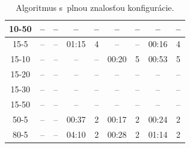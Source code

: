 \documentclass[
  printed, %
  oneside, %
  notable,   %
  nolof,     %
  nolot,     %
]{fithesis3}
\begin{document}
\begin{table}[hp!]
\begin{tabular}{c|cc|cc|cc|cc}
10-50  & -- & -- & -- & -- & -- & -- & -- & -- \\ \hline
15-5  & -- & -- & 01:15 & 4 & -- & -- & \cellcolor{table-green}00:16 & \cellcolor{table-green}4 \\
15-10  & -- & -- & -- & -- & \cellcolor{table-green}00:20 & \cellcolor{table-green}5 & 00:53 & 5 \\
15-20  & -- & -- & -- & -- & -- & -- & -- & -- \\
15-30  & -- & -- & -- & -- & -- & -- & -- & -- \\
15-50  & -- & -- & -- & -- & -- & -- & -- & -- \\ \hline
50-5  & -- & -- & 00:37 & 2 & \cellcolor{table-green}00:17 & \cellcolor{table-green}2 & 00:24 & 2 \\ \hline
80-5  & -- & -- & 04:10 & 2 & \cellcolor{table-green}00:28 & \cellcolor{table-green}2 & 01:14 & 2 \\ 
\end{tabular}%

\caption{Algoritmus s~plnou znalosťou konfigurácie. }
\label{tab:algo1}
\end{table}
\end{document}
